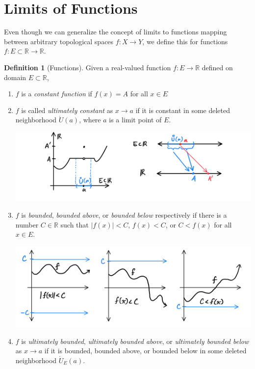 \documentclass{article}
\theoremstyle{remark}
\theoremstyle{definition}
\newtheorem{definition}{Definition}[section]
\begin{document}
\section{Limits of Functions}
Even though we can generalize the concept of limits to functions mapping between arbitrary topological spaces $f: X \longrightarrow Y$, we define this for functions $f: E \subset \mathbb{R} \longrightarrow \mathbb{R}$. 

\begin{definition}[Functions]
Given a real-valued function $f: E \longrightarrow \mathbb{R}$ defined on domain $E \subset \mathbb{R}$,
\begin{enumerate}
    \item $f$ is a \textit{constant function} if $f(x) = A$ for all $x \in E$
    \item $f$ is called \textit{ultimately constant} as $x \rightarrow a$ if it is constant in some deleted neighborhood $\mathring{U} (a)$, where $a$ is a limit point of $E$.
    \begin{center}
        \includegraphics[scale=0.28]{img/Ultimately_Constant_Function.PNG}
    \end{center}
    \item $f$ is \textit{bounded}, \textit{bounded above}, or \textit{bounded below} respectively if there is a number $C \in \mathbb{R}$ such that $|f(x)|<C$, $f(x)<C$, or $C<f(x)$ for all $x \in E$.
    \begin{center}
        \includegraphics[scale=0.25]{img/Bounded_Three.PNG}
    \end{center}
    \item $f$ is \textit{ultimately bounded}, \textit{ultimately bounded above}, or \textit{ultimately bounded below} as $x \rightarrow a$ if it is bounded, bounded above, or bounded below in some deleted neighborhood $\mathring{U}_E (a)$. 

\end{enumerate}
\end{definition}
\end{document}
